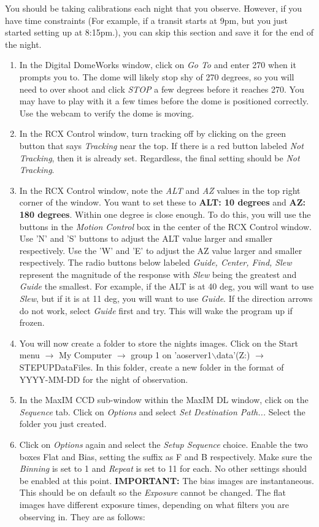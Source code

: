 \documentclass[11pt]{report}
\begin{document}
You should be taking calibrations each night that you observe. However, if you have time constraints (For example, if a transit starts at 9pm, but you just started setting up at 8:15pm.), you can skip this section and save it for the end of the night. 
\begin{enumerate}
\item In the Digital DomeWorks window, click on \emph{Go To} and enter 270 when it prompts you to. The dome will likely stop shy of 270 degrees, so you will need to over shoot and click \emph{STOP} a few degrees before it reaches 270. You may have to play with it a few times before the dome is positioned correctly. Use the webcam to verify the dome is moving. 
\item In the RCX Control window, turn tracking off by clicking on the green button that says \emph{Tracking} near the top. If there is a red button labeled \emph{Not Tracking}, then it is already set. Regardless, the final setting should be \emph{Not Tracking}.
\item In the RCX Control window, note the \emph{ALT} and \emph{AZ} values in the top right corner of the window. You want to set these to {\bf ALT: 10 degrees} and {\bf AZ: 180 degrees}. Within one degree is close enough. To do this, you will use the buttons in the \emph{Motion Control} box in the center of the RCX Control window. Use 'N' and 'S' buttons to adjust the ALT value larger and smaller respectively. Use the 'W' and 'E' to adjust the AZ value larger and smaller respectively. The radio buttons below labeled \emph{Guide, Center, Find, Slew} represent the magnitude of the response with \emph{Slew} being the greatest and \emph{Guide} the smallest. For example, if the ALT is at 40 deg, you will want to use \emph{Slew}, but if it is at 11 deg, you will want to use \emph{Guide}. If the direction arrows do not work, select \emph{Guide} first and try. This will wake the program up if frozen.
\item You will now create a folder to store the nights images. Click on the Start menu {$\rightarrow$} My Computer {$\rightarrow$} group 1 on 'aoserver1{$\backslash$}data'(Z:) {$\rightarrow$} STEPUPDataFiles. In this folder, create a new folder in the format of YYYY-MM-DD for the night of observation.
\item In the MaxIM CCD sub-window within the MaxIM DL window, click on the \emph{Sequence} tab. Click on \emph{Options} and select \emph{Set Destination Path...} Select the folder you just created.
\item Click on \emph{Options} again and select the \emph{Setup Sequence} choice. Enable the two boxes Flat and Bias, setting the suffix as F and B respectively. Make sure the \emph{Binning} is set to 1 and \emph{Repeat} is set to 11 for each. No other settings should be enabled at this point. {\bf IMPORTANT:} The bias images are instantaneous. This should be on default so the \emph{Exposure} cannot be changed. The flat images have different exposure times, depending on what filters you are observing in. They are as follows:

\end{enumerate}
\end{document}
